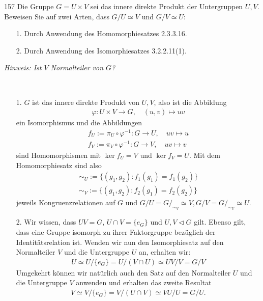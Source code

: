 \begin{algebraUE}{157}
Die Gruppe $G = U \times V$ sei das innere direkte Produkt der Untergruppen $U,V$.
Beweisen Sie auf zwei Arten, dass $G/U \simeq V$ und $G/V \simeq U$:
\begin{itemize}
  \item [1.] Durch Anwendung des Homomorphiesatzes 2.3.3.16.
  \item [2.] Durch Anwendung des Isomorphiesatzes 3.2.2.11(1).
\end{itemize}
\textit{Hinweis: Ist $V$ Normalteiler von $G$?}
\end{algebraUE}
\begin{solution}
\leavevmode \\
\begin{itemize}
  \item [1.] $G$ ist das innere direkte Produkt von $U,V$, also ist die Abbildung
  \begin{align*}
    \varphi: U \times V \rightarrow G, \quad (u,v) \mapsto uv
  \end{align*}
  ein Isomorphismus und die Abbildungen
  \begin{align*}
    f_U := \pi_U \circ \varphi^{-1}: G \rightarrow U, \quad uv \mapsto u \\
    f_V := \pi_V \circ \varphi^{-1}: G \rightarrow V, \quad uv \mapsto v
  \end{align*}
  sind Homomorphismen mit $\ker f_U = V$ und $\ker f_V = U$. Mit dem Homomorphiesatz sind also
  \begin{align*}
    \sim_U := \{(g_1,g_2): f_1(g_1) = f_1(g_2)\} \\
    \sim_V := \{(g_1,g_2): f_2(g_1) = f_2(g_2)\}
  \end{align*}
  jeweils Kongruenzrelationen auf $G$ und $G/U = G/_{\sim_V} \simeq V, G/V = G/_{\sim_U} \simeq U$.
  \item [2.] Wir wissen, dass $UV = G$, $U \cap V = \{e_G\}$ und $ U,V \vartriangleleft G$ gilt.
  Ebenso gilt, dass eine Gruppe isomorph zu ihrer Faktorgruppe bezüglich der Identitätsrelation ist.
  Wenden wir nun den Isomorphiesatz auf den Normalteiler $V$ und die Untergruppe $U$ an, erhalten wir:
  \begin{align*}
    U \simeq U/\{e_G\} = U/(V\cap U) \simeq UV/V = G/V
  \end{align*}
  Umgekehrt können wir natürlich auch den Satz auf den Normalteiler $U$ und die Untergruppe $V$ anwenden
  und erhalten das zweite Resultat
  \begin{align*}
    V \simeq V/\{e_G\} = V/(U\cap V) \simeq VU/U = G/U.
  \end{align*}
\end{itemize}
\end{solution}
